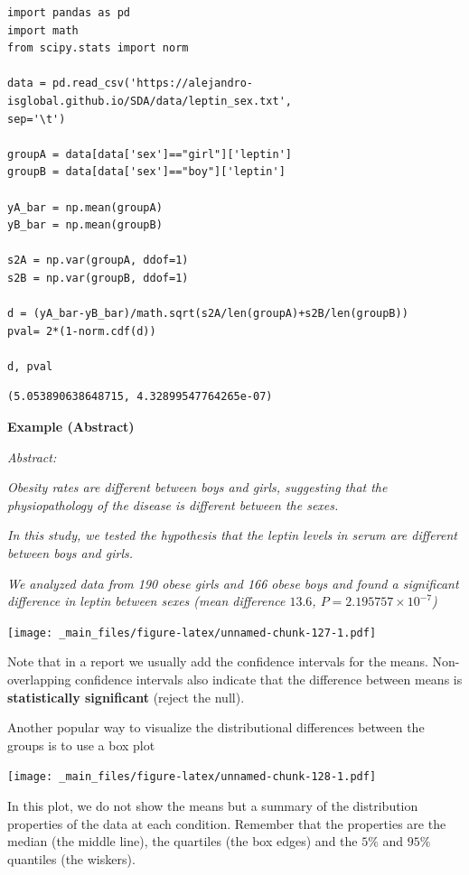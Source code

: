 \documentclass[
]{book}
\begin{document}
\begin{verbatim}
import pandas as pd
import math
from scipy.stats import norm

data = pd.read_csv('https://alejandro-isglobal.github.io/SDA/data/leptin_sex.txt', 
sep='\t')

groupA = data[data['sex']=="girl"]['leptin']
groupB = data[data['sex']=="boy"]['leptin']

yA_bar = np.mean(groupA)
yB_bar = np.mean(groupB)

s2A = np.var(groupA, ddof=1)
s2B = np.var(groupB, ddof=1)

d = (yA_bar-yB_bar)/math.sqrt(s2A/len(groupA)+s2B/len(groupB))
pval= 2*(1-norm.cdf(d))

d, pval
\end{verbatim}

\begin{verbatim}
(5.053890638648715, 4.32899547764265e-07)
\end{verbatim}

\textbf{Example (Abstract)}

\emph{Abstract:}

\emph{Obesity rates are different between boys and girls, suggesting that the physiopathology of the disease is different between the sexes.}

\emph{In this study, we tested the hypothesis that the leptin levels in serum are different between boys and girls.}

\emph{We analyzed data from 190 obese girls and 166 obese boys and found a significant difference in leptin between sexes (mean difference \(13.6\), \(P=2.195757 \times 10^{-7}\))}

\texttt{[image: \_main\_files/figure-latex/unnamed-chunk-127-1.pdf]}

Note that in a report we usually add the confidence intervals for the means. Non-overlapping confidence intervals also indicate that the difference between means is \textbf{statistically significant} (reject the null).

Another popular way to visualize the distributional differences between the groups is to use a box plot

\texttt{[image: \_main\_files/figure-latex/unnamed-chunk-128-1.pdf]}

In this plot, we do not show the means but a summary of the distribution properties of the data at each condition. Remember that the properties are the median (the middle line), the quartiles (the box edges) and the \(5\%\) and \(95\%\) quantiles (the wiskers).
\end{document}
